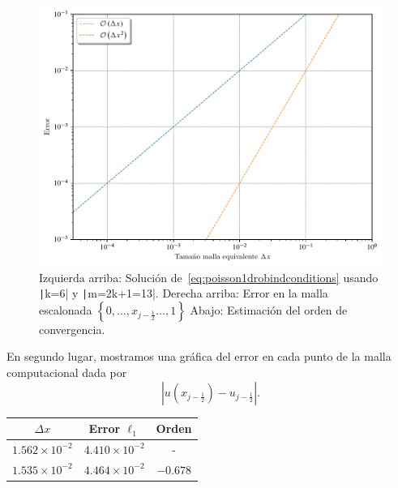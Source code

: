 \begin{problem}
\begin{figure}[ht!]
      \includegraphics[width=.3\paperwidth]{elliptic1Dconvergenceorder.pdf}
      \caption{Izquierda arriba: Solución de~\eqref{eq:poisson1drobindconditions}
            usando \texttt|k=6| y \texttt|m=2k+1=13|.
            Derecha arriba: Error en la malla escalonada
            \begin{math}
                  \left\{
                  0,
                  \dotsc,
                  x_{j-\frac{1}{2}}
                  \dotsc,
                  1
                  \right\}
            \end{math}
            Abajo: Estimación del orden de convergencia.}
\end{figure}

En segundo lugar, mostramos una gráfica del error en cada punto de la malla computacional
dada por
\begin{equation*}
      \left|
      u\left(x_{j-\frac{1}{2}}\right)-
      u_{j-\frac{1}{2}}
      \right|.
\end{equation*}

\begin{table}[ht!]
      \centering
      \begin{tabular}{ccc}
            \toprule
            $\Delta x$            & Error $\ell_1$        & Orden    \\
            \midrule
            $1.562\times 10^{-2}$ & $4.410\times 10^{-2}$ & -        \\
            $1.535\times 10^{-2}$ & $4.464\times 10^{-2}$ & $-0.678$ \\
            \bottomrule
      \end{tabular}
      \label{table:errors}
\end{table}


\end{problem}
